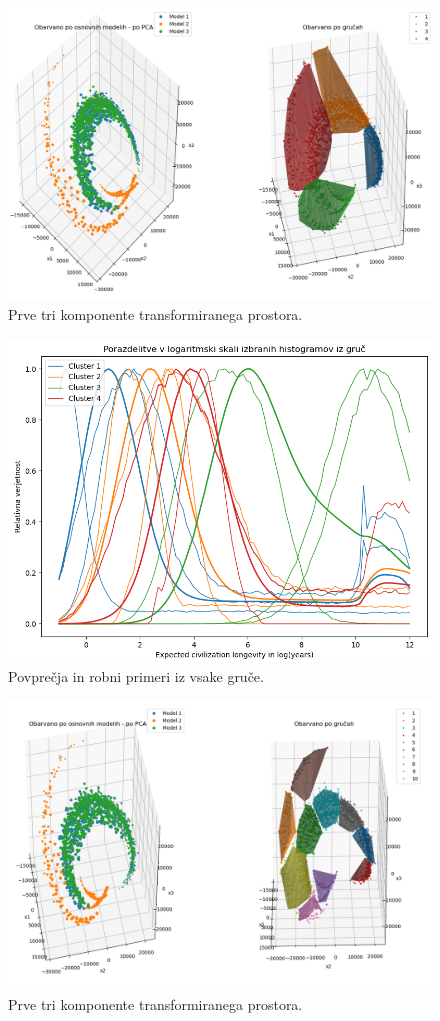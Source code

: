 \documentclass[a4paper]{IEEEtran}
\begin{document}
\begin{figure}
	\centering
	\includegraphics[width=0.8\linewidth]{Figures/log4pca}
	\caption{Prve tri komponente transformiranega prostora.}
	\label{fig:log4pca}
\end{figure}

\begin{figure}
	\centering
	\includegraphics[width=0.9\linewidth]{Figures/log4konveks}
	\caption{Povprečja in robni primeri iz vsake gruče.}
	\label{fig:log4konveks}
\end{figure}

\begin{figure}
	\centering
	\includegraphics[width=0.9\linewidth]{Figures/log10pca}
	\caption{Prve tri komponente transformiranega prostora.}
	\label{fig:log10pca}
\end{figure}
\end{document}
